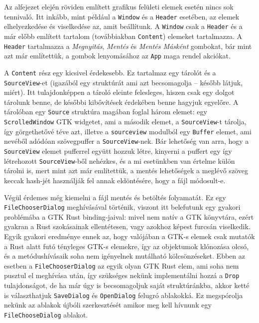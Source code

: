 Az alfejezet elején röviden említett grafikus felületi elemek esetén nincs sok tennivaló.
Itt inkább, mint például a \texttt{Window} és a \texttt{Header} esetében, az elemek elhelyezkedése és viselkedése az,
amit beállítunk.
A \texttt{Window} csak a \texttt{Header} és a már előbb említett tartalom (továbbiakban \texttt{Content})
elemeket tartalmazza.
A \texttt{Header} tartalmazza a \textit{Megnyitás}, \textit{Mentés} és \textit{Mentés Másként} gombokat,
bár mint azt már említettük, a gombok lenyomásához az \texttt{App} maga rendel akciókat.

A \texttt{Content} rész egy kicsivel érdekesebb.
Ez tartalmaz egy tárolót és a \texttt{SourceView}-et (igazából egy struktúrát ami azt becsomagolja -- 
később látjuk, miért).
Itt tulajdonképpen a tároló eleinte felesleges, hiszen csak egy dolgot tárolunk benne, de későbbi kibővítések
érdekében benne hagyjuk egyelőre.
A tárolóban egy \texttt{Source} struktúra magában foglal három elemet: egy \texttt{ScrolledWindow} GTK widgetet,
ami a második elemet, a \texttt{SourceView}-t tárolja, így görgethetővé téve azt, 
illetve a \texttt{sourceview} modulból egy \texttt{Buffer} elemet, ami nevéből adódóan szövegpuffer a \texttt{SourceView}-nek.
Bár lehetőség van arra, hogy a \texttt{SourceView} elemet pufferrel együtt hozzuk létre,
kinyerni a puffert egy így létrehozott \texttt{SourceView}-ből nehézkes,
és a mi esetünkben van értelme külön tárolni is, mert mint azt már említettük, a mentés lehetőségek
a meglévő szöveg keccak hash-jét használják fel annak eldöntésére, hogy a fájl módosult-e.

Végül érdemes még kiemelni a fájl mentés és betöltés folyamatát.
Ez egy \texttt{File\-Chooser\-Dialog} meghívásával történik, viszont itt belefutunk egy gyakori
problémába a GTK Rust binding-jaival: mivel nem natív a GTK könyvtára,
ezért gyakran a Rust szokásainak ellentétesen, vagy azokhoz képest furcsán viselkedik.
Egyik gyakori eredménye ennek az, hogy valójában a GTK-s elemek csak mutatók a Rust alatt futó
tényleges GTK-s elemekre\cite{glib:no_need_for_borrows}, így az objektumok klónozása olcsó,
és a metódushívásaik soha nem igényelnek mutálható kölcsönzéseket.
Ebben az esetben a \texttt{FileChooserDialog} az egyik olyan GTK Rust elem, ami soha nem pusztul el meghívása után,
így szükséges nekünk implementálni hozzá a \texttt{Drop} tulajdonságot, de ha már úgy is becsomagoljuk
saját struktúránkba, akkor ketté is választhatjuk \texttt{SaveDialog} és \texttt{OpenDialog} felugró ablakokká.
Ez megspórolja nekünk az ablakok újbóli szerkesztését amikor meg kell hívnunk egy \texttt{FileChooseDialog} ablakot.

